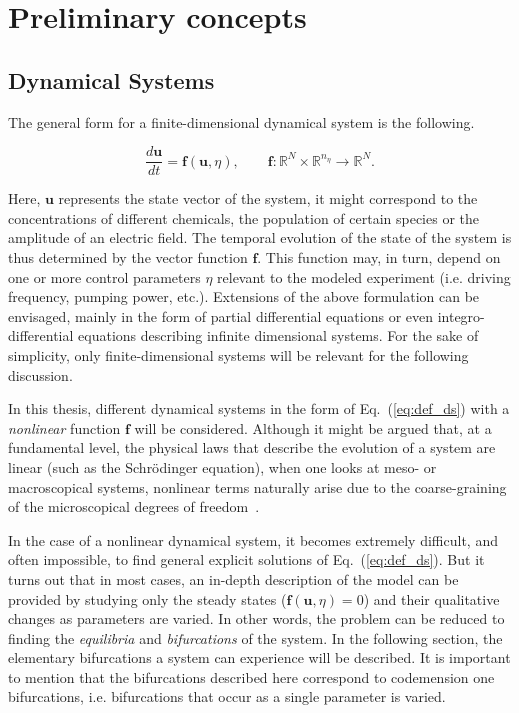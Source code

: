 \chapter{Preliminary concepts}

\label{ch:preliminary}

\section{Dynamical Systems}


The general form for a finite-dimensional dynamical system is the following.

\begin{equation}
    \dfrac{d\bm{u}}{dt} = \bm{f}(\bm{u}, \eta), \qquad \bm{f} : \mathbb{R}^N \times \mathbb{R}^{n_\eta} \to \mathbb{R}^N.
    \label{eq:def_ds}
\end{equation}

Here, $\bm{u}$ represents the state vector of the system, it might correspond to the
concentrations of different chemicals, the population of certain species or the amplitude
of an electric field. The temporal evolution of the state of the system is thus determined by 
the vector function $\bm{f}$. This function may, in turn, depend on one or more control
parameters $\eta$ relevant to the modeled experiment (i.e. driving frequency, pumping power, etc.).
Extensions of the above formulation can be envisaged, mainly in the form of partial differential equations
or even integro-differential equations describing infinite dimensional systems. For the sake of simplicity,
only finite-dimensional systems will be relevant for the following discussion.

In this thesis, different dynamical systems in the form of Eq.~(\ref{eq:def_ds}) with a {\em nonlinear} function
$\bm{f}$ will be considered. Although it might be argued that, at a fundamental level, the physical laws
that describe the evolution of a system are linear (such as the Schrödinger equation), when one looks at meso- or macroscopical
systems, nonlinear terms naturally arise due to the coarse-graining of the microscopical degrees of freedom~\cite{kardar2007statistical}.


In the case of a nonlinear dynamical system, it becomes extremely difficult, and often impossible, to find
general explicit solutions of Eq.~(\ref{eq:def_ds}). But it turns out that in most cases, an in-depth
description of the model can be provided by studying only the steady states ($\bm{f}(\bm{u}, \eta) = 0$) and their qualitative changes as parameters 
are varied. In other words, the problem can be reduced to finding the {\em equilibria} and {\em bifurcations} of the system.
In the following section, the elementary bifurcations a system can experience will be described. It is
important to mention that the bifurcations described here correspond to codemension one bifurcations, i.e. 
bifurcations that occur as a single parameter is varied.

